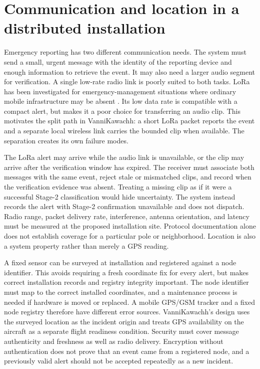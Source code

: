 \documentclass[12pt,a4paper]{report}
\begin{document}
\section{Communication and location in a distributed installation}

Emergency reporting has two different communication needs. The system must send a small, urgent message with the identity of the reporting device and enough information to retrieve the event. It may also need a larger audio segment for verification. A single low-rate radio link is poorly suited to both tasks. LoRa has been investigated for emergency-management situations where ordinary mobile infrastructure may be absent \cite{sciullo,lorawan}. Its low data rate is compatible with a compact alert, but makes it a poor choice for transferring an audio clip. This motivates the split path in VanniKawachh: a short LoRa packet reports the event and a separate local wireless link carries the bounded clip when available. The separation creates its own failure modes.

The LoRa alert may arrive while the audio link is unavailable, or the clip may arrive after the verification window has expired. The receiver must associate both messages with the same event, reject stale or mismatched clips, and record when the verification evidence was absent. Treating a missing clip as if it were a successful Stage-2 classification would hide uncertainty. The system instead records the alert with Stage-2 confirmation unavailable and does not dispatch. Radio range, packet delivery rate, interference, antenna orientation, and latency must be measured at the proposed installation site. Protocol documentation alone does not establish coverage for a particular pole or neighborhood. Location is also a system property rather than merely a GPS reading.

A fixed sensor can be surveyed at installation and registered against a node identifier. This avoids requiring a fresh coordinate fix for every alert, but makes correct installation records and registry integrity important. The node identifier must map to the correct installed coordinates, and a maintenance process is needed if hardware is moved or replaced. A mobile GPS/GSM tracker and a fixed node registry therefore have different error sources. VanniKawachh's design uses the surveyed location as the incident origin and treats GPS availability on the aircraft as a separate flight readiness condition. Security must cover message authenticity and freshness as well as radio delivery. Encryption without authentication does not prove that an event came from a registered node, and a previously valid alert should not be accepted repeatedly as a new incident.
\end{document}
